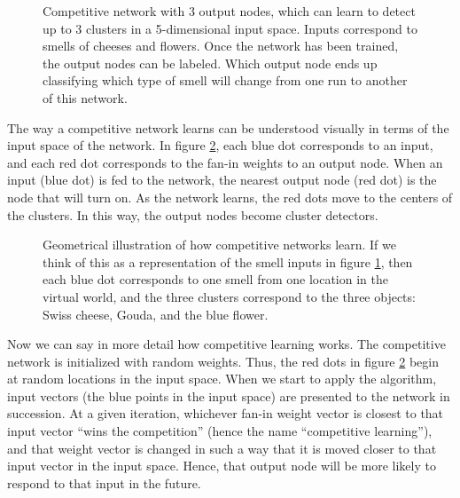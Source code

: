 \begin{figure}[h]
\centering
{}
\caption[Simbrain screenshot]{Competitive network with 3 output nodes, which can learn to detect up to 3 clusters in a 5-dimensional input space. Inputs correspond to smells of cheeses and flowers. Once the network has been trained, the output nodes can be labeled. Which output node ends up classifying which type of smell will change from one run to another of this network.}
\label{competitive_3}
\end{figure}

The way a competitive network learns can be understood visually in terms of the input space of the network. In figure \ref{competitiveInputSpace}, each blue dot corresponds to an input, and each red dot corresponds to the fan-in weights to an output node. When an input (blue dot) is fed to the network, the nearest output node (red dot) is the node that will turn on. As the network learns, the red dots move to the centers of the clusters. In this way, the output nodes become cluster detectors. 

\begin{figure}[h]
\centering
{}
\caption[Pamela Payne.]{Geometrical illustration of how competitive networks learn. If we think of this as a representation of the smell inputs in figure \ref{competitive_3}, then each blue dot corresponds to one smell from one location in the virtual world, and the three clusters correspond to the three objects: Swiss cheese, Gouda, and the blue flower. }
\label{competitiveInputSpace}
\end{figure}

Now we can say in more detail how competitive learning works. The competitive network is initialized with random weights. Thus, the red dots in figure \ref{competitiveInputSpace} begin at random locations in the input space. When we start to apply the algorithm, input vectors (the blue points in the input space) are presented to the network in succession. At a given iteration, whichever fan-in weight vector is closest to that input vector ``wins  the competition'' (hence the name ``competitive learning''), and that weight vector is changed in such a way that it is moved closer to that input vector in the input space. Hence, that output node will be more likely to respond to that input in the future.


